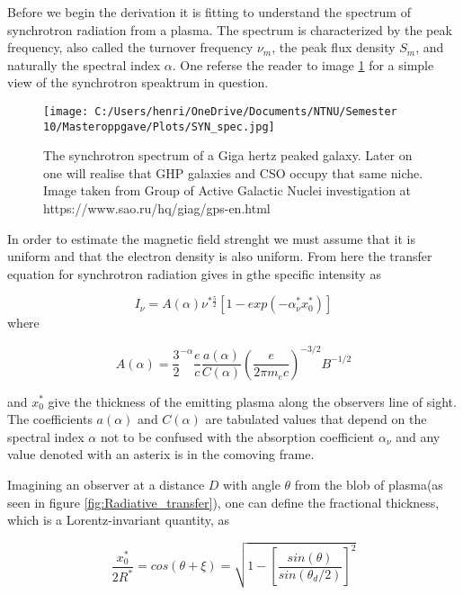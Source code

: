 Before we begin the derivation it is fitting to understand the spectrum of synchrotron radiation from a plasma. The spectrum is characterized by the peak frequency, also called the turnover frequency $\nu_m$, the peak flux density $S_m$, and naturally the spectral index $\alpha$. One referse the reader to image \ref{fig:synchrotron_spectrum} for a simple view of the synchrotron speaktrum in question. 

\begin{figure}
    \centering
    \texttt{[image: C:/Users/henri/OneDrive/Documents/NTNU/Semester 10/Masteroppgave/Plots/SYN\_spec.jpg]}
    \caption{The synchrotron spectrum of a Giga hertz peaked galaxy. Later on one will realise that GHP galaxies and CSO occupy that same niche. Image taken from  Group of Active Galactic Nuclei investigation at https://www.sao.ru/hq/giag/gps-en.html }
    \label{fig:synchrotron_spectrum}
\end{figure}

In order to estimate the magnetic field strenght we must assume that it is uniform and that the electron density is also uniform. From here the transfer equation for synchrotron radiation gives in \cite{Hirotani_2005} gthe specific intensity as 

\begin{equation}
    I_\nu = A(\alpha) \nu^{*\frac{5}{2}}[1-exp(-\alpha_\nu^*x_0^* )] 
\end{equation}
where 

\begin{equation}
    A(\alpha) = \frac{3}{2}^{-\alpha}\frac{e}{c}\frac{a(\alpha)}{C(\alpha)}\left(\frac{e}{2\pi m_e c}\right)^{-3/2}B^{-1/2}
\end{equation}

and $x_0^*$ give the thickness of the emitting plasma along the observers line of sight. The coefficients $a(\alpha)$ and $C(\alpha)$ are tabulated values that depend on the spectral index $\alpha$ not to be confused with the absorption coefficient $\alpha_\nu$  and any value denoted with an asterix is in the comoving frame. 

Imagining an observer at a distance $D$ with angle $\theta$ from the blob of plasma(as seen in figure \ref{fig:Radiative_transfer}), one can define the fractional thickness, which is a Lorentz-invariant quantity, as

\begin{equation}
    \frac{x_0^*}{2R^*} = cos(\theta + \xi) = \sqrt{1-\left[\frac{sin(\theta)}{sin(\theta_d/2)}\right]^2}
\end{equation}

